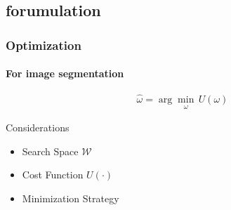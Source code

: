 \graphicspath{{chapters/method/figures/}}

\subsection{forumulation}
\begin{frame}\frametitle{Optimization}
\framesubtitle{For image segmentation}

\begin{equation*}
\hat{\omega} = \arg \min_{\substack{\omega}} \,U(\omega)
\end{equation*} 

\begin{block}{Considerations}
  \begin{itemize}
    \item Search Space $\mathcal{W}$
    \item Cost Function $U(\cdot)$
      \item Minimization Strategy
  \end{itemize}
\end{block}
\end{frame}

